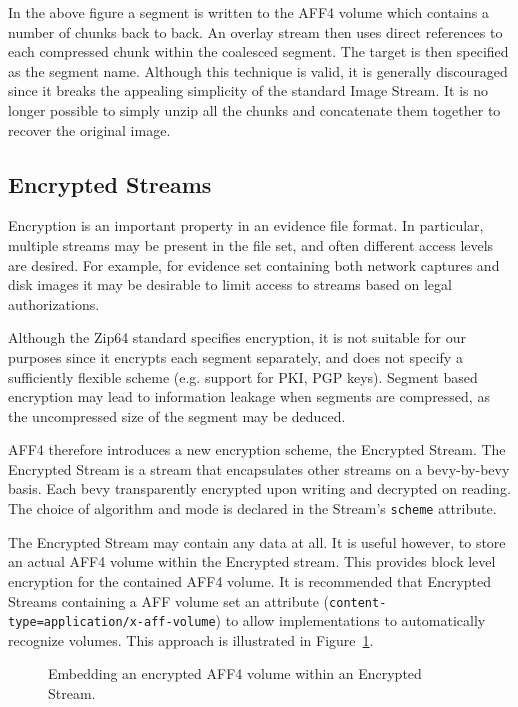 \documentclass[10pt, conference]{IEEEtran}
\begin{document}
In the above figure a segment is written to the AFF4 volume which
contains a number of chunks back to back. An overlay stream then uses
direct references to each compressed chunk within the coalesced
segment. The target is then specified as the segment name. Although
this technique is valid, it is generally discouraged since it breaks
the appealing simplicity of the standard Image Stream.  It is no
longer possible to simply unzip all the chunks and concatenate them
together to recover the original image.



\subsection{Encrypted Streams}
Encryption is an important property in an evidence file format. In
particular, multiple streams may be present in the file set, and often
different access levels are desired. For example, for evidence set
containing both network captures and disk images it may be desirable
to limit access to streams based on legal authorizations.

Although the Zip64 standard specifies encryption, it is not suitable
for our purposes since it encrypts each segment separately, and does
not specify a sufficiently flexible scheme (e.g. support for PKI, PGP
keys). Segment based encryption may lead to information leakage when
segments are compressed, as the uncompressed size of the segment may
be deduced.

AFF4 therefore introduces a new encryption scheme, the Encrypted
Stream.  The Encrypted Stream is a stream that encapsulates other
streams on a bevy-by-bevy basis. Each bevy transparently encrypted upon
writing and decrypted on reading. The choice of algorithm and mode is declared in the
Stream's \texttt{scheme} attribute. 

The Encrypted Stream may contain any data at all. It is useful
however, to store an actual AFF4 volume within the Encrypted
stream. This provides block level encryption for the contained AFF4
volume. It is recommended that Encrypted Streams containing a AFF
volume set an attribute (\texttt{content-type=application/x-aff-volume})
to allow implementations to automatically recognize volumes. This
approach is illustrated in Figure~\ref{crypted_fif}.

\begin{figure}[tb]
  \begin{center}
  \mbox{\columnwidth {}}
  \caption{Embedding an encrypted AFF4 volume within an Encrypted Stream.}
  \label{crypted_fif}
  \end{center}
\end{figure}
\end{document}
